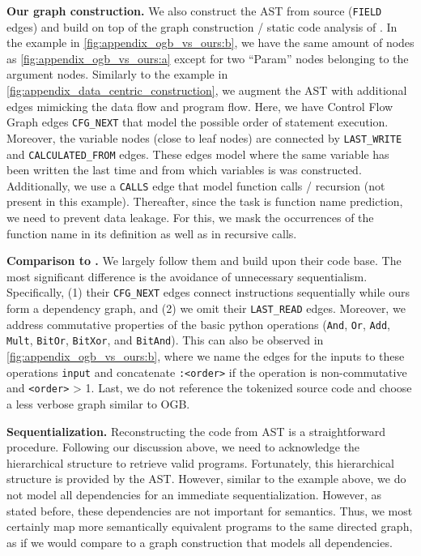 \documentclass{article}
\begin{document}
\textbf{Our graph construction.} We also construct the AST from source (\verb|FIELD| edges) and build on top of the graph construction / static code analysis of \citet{bieber_library_2022}. In the example in \autoref{fig:appendix_ogb_vs_ours:b}, we have the same amount of nodes as \autoref{fig:appendix_ogb_vs_ours:a} except for two ``Param'' nodes belonging to the argument nodes. Similarly to the example in \autoref{fig:appendix_data_centric_construction}, we augment the AST with additional edges mimicking the data flow and program flow. Here, we have Control Flow Graph edges \verb|CFG_NEXT| that model the possible order of statement execution. Moreover, the variable nodes (close to leaf nodes) are connected by \verb|LAST_WRITE| and \verb|CALCULATED_FROM| edges. These edges model where the same variable has been written the last time and from which variables is was constructed. Additionally, we use a \verb|CALLS| edge that model function calls / recursion (not present in this example). Thereafter, since the task is function name prediction, we need to prevent data leakage. For this, we mask the occurrences of the function name in its definition as well as in recursive calls.

\textbf{Comparison to \citet{bieber_library_2022}.} We largely follow them and build upon their code base. The most significant difference is the avoidance of unnecessary sequentialism. Specifically, (1) their \verb|CFG_NEXT| edges connect instructions sequentially while ours form a dependency graph, and (2) we omit their \verb|LAST_READ| edges. Moreover, we address commutative properties of the basic python operations (\verb|And|, \verb|Or|, \verb|Add|, \verb|Mult|, \verb|BitOr|, \verb|BitXor|, and \verb|BitAnd|). This can also be observed in \autoref{fig:appendix_ogb_vs_ours:b}, where we name the edges for the inputs to these operations \verb|input| and concatenate \verb|:<order>| if the operation is non-commutative and \verb|<order>| > 1. Last, we do not reference the tokenized source code and choose a less verbose graph similar to OGB. 

\textbf{Sequentialization.} Reconstructing the code from AST is a straightforward procedure. Following our discussion above, we need to acknowledge the hierarchical structure to retrieve valid programs. Fortunately, this hierarchical structure is provided by the AST. However, similar to the example above, we do not model all dependencies for an immediate sequentialization. However, as stated before, these dependencies are not important for semantics. Thus, we most certainly map more semantically equivalent programs to the same directed graph, as if we would compare to a graph construction that models all dependencies.
\end{document}
